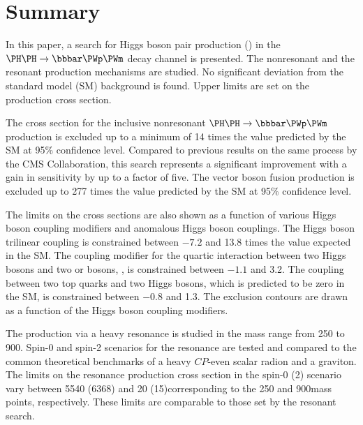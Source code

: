 \clearpage

\section{Summary}
\label{summary}
In this paper, a search for Higgs boson pair production (\HH) in the $\HH\to\bbWW$ decay channel is presented.
The nonresonant and the resonant production mechanisms are studied.
No significant deviation from the standard model (SM) background is found. Upper limits are set on the \HH production cross section.

The cross section for the inclusive nonresonant $\HH\to\bbWW$ production is excluded up to a minimum of 14 times the value predicted by the SM at 95\% confidence level.
Compared to previous results on the same process by the CMS Collaboration,
this search represents a significant improvement with a gain in sensitivity by up to a factor of five.
The vector boson fusion production is excluded up to 277 times the value predicted by the SM at 95\% confidence level.


The limits on the cross sections are also shown as a function of various Higgs boson coupling modifiers and anomalous Higgs boson couplings.
The Higgs boson trilinear coupling \lambdahhh is constrained between $-7.2$ and 13.8 times the value expected in the SM. The coupling modifier for the quartic interaction between two Higgs bosons and two \PW or \PZ bosons, \CVV, is constrained between $-1.1$ and 3.2. The coupling between two top quarks and two Higgs bosons, which is predicted to be zero in the SM, is constrained between $-0.8$ and 1.3. The exclusion contours are drawn as a function of the Higgs boson coupling modifiers.

The \HH production via a heavy resonance is studied in the mass range from 250 to 900\GeV.
Spin-0 and spin-2 scenarios for the resonance are tested and compared to the common theoretical benchmarks of a heavy $CP$-even scalar radion and a graviton. The limits on the resonance production cross section in the spin-0 (2) scenario vary between 5540 (6368) and 20 (15)\fb corresponding to the 250 and 900\GeV mass points, respectively. These limits are comparable to those set by the \bbgg resonant \HH search.  

